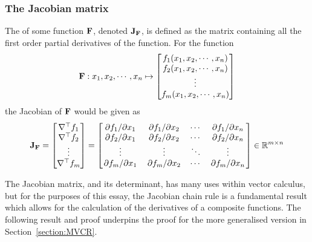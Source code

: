 \subsubsection{The Jacobian matrix}
\begin{defn}
    The  of some function $\mathbf{F}$, denoted $\mathbf{J}_{\mathbf{F}}$, is defined as the matrix containing all the first order partial derivatives
    of the function. For the function
    $$\mathbf{F}:x_1,x_2,\cdots,x_n\mapsto\begin{bmatrix}
        f_1(x_1,x_2,\cdots,x_n)\\
        f_2(x_1,x_2,\cdots,x_n)\\
        \vdots\\
        f_m(x_1,x_2,\cdots,x_n)
    \end{bmatrix}$$
    the Jacobian of $\mathbf{F}$ would be given as
    $$
        \mathbf{J}_{\mathbf{F}}=\begin{bmatrix}
            \nabla^\top f_1\\
            \nabla^\top f_2\\
            \vdots\\
            \nabla^\top f_m
        \end{bmatrix}=\begin{bmatrix}
            \pdv*{f_1}{x_1} & \pdv*{f_1}{x_2} & \cdots & \pdv*{f_1}{x_n}\\
            \pdv*{f_2}{x_1} & \pdv*{f_2}{x_2} & \cdots & \pdv*{f_2}{x_n}\\
            \vdots & \vdots & \ddots & \vdots \\
            \pdv*{f_m}{x_1} & \pdv*{f_m}{x_2} & \cdots & \pdv*{f_m}{x_n}\\
        \end{bmatrix}\in\mathbb{R}^{m\times n}
    $$
\end{defn}
The Jacobian matrix, and its determinant, has many uses within vector calculus, but for the purposes of this essay, the Jacobian chain rule is a fundamental result which allows for the calculation of the derivatives of a composite functions. The following result and proof underpins the proof for the more generalised version in Section~\ref{section:MVCR}.
